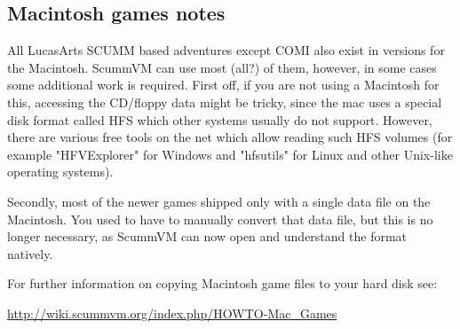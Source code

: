 \subsection{Macintosh games notes}

All LucasArts SCUMM based adventures except COMI also exist in versions for the
Macintosh. ScummVM can use most (all?) of them, however, in some cases some
additional work is required. First off, if you are not using a Macintosh for
this, accessing the CD/floppy data might be tricky, since the mac uses a
special disk format called HFS which other systems usually do not support.
However, there are various free tools on the net which allow reading such HFS
volumes (for example "HFVExplorer" for Windows and "hfsutils" for Linux and
other Unix-like operating systems).

Secondly, most of the newer games shipped only with a  single data file on the
Macintosh. You used to have to manually convert that data file, but this is no
longer necessary, as ScummVM can now open and understand the format natively.

For further information on copying Macintosh game files to your hard disk see:

  \url{http://wiki.scummvm.org/index.php/HOWTO-Mac_Games}


